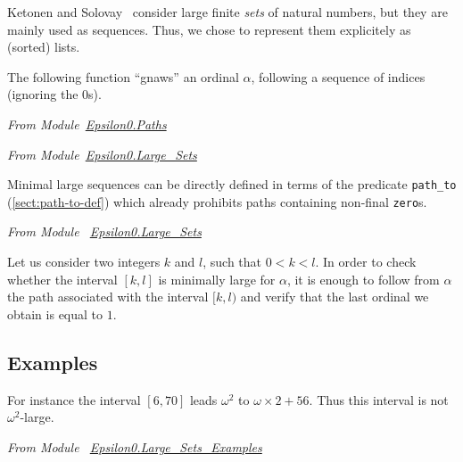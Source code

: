 \begin{remark}
  Ketonen and Solovay~\cite{KS81} consider  large finite \emph{sets} of natural numbers,  but they are mainly used as sequences. Thus, we chose to represent them explicitely as (sorted) lists. 
\end{remark}


The following function ``gnaws'' an ordinal $\alpha$, following a sequence of indices (ignoring the $0$s).

\vspace{4pt}

\noindent
\emph{From Module~\href{../theories/html/hydras.Epsilon0.Paths.html\#gnaw}{Epsilon0.Paths}}




\noindent
\emph{From Module~\href{../theories/html/hydras.Epsilon0.Large_SetsPaths.html\#gnaw}{Epsilon0.Large\_Sets}}






Minimal large sequences can be directly defined in terms of the
predicate \texttt{path\_to} (\vref{sect:path-to-def}) which already prohibits paths containing non-final \texttt{zero}s.

\vspace{4pt}

\noindent
\emph{From Module~ \href{../theories/html/hydras.Epsilon0.Large_Sets.html\#mlarge}{Epsilon0.Large\_Sets}}






Let us consider two integers $k$ and $l$, such that $0<k<l$. In order to check whether the interval $[k,l]$ is minimally large for $\alpha$, it is enough to
follow from $\alpha$ the path associated with the interval $[k,l)$ and verify that the last ordinal we obtain is equal to $1$.
 
\subsection{Examples}

For instance the interval $[6,70]$ leads $\omega^2$ to $\omega\times 2 + 56$. Thus this interval is not $\omega^2$-large.



\noindent
\emph{From Module~ \href{../theories/html/hydras.Epsilon0.Large_Sets_Examples.html\#mlarge}{Epsilon0.Large\_Sets\_Examples}}

